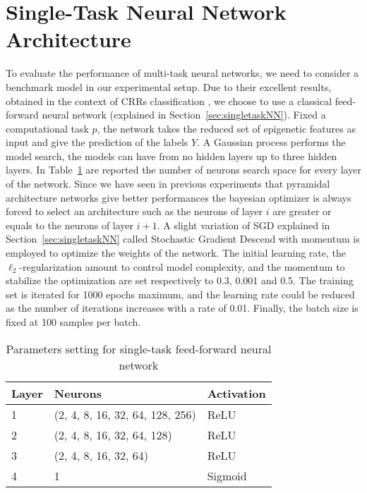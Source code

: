 \section{Single-Task Neural Network Architecture}
To evaluate the performance of multi-task neural networks, we need to consider a benchmark model in our experimental setup. Due to their excellent results, obtained in the context of CRRs classification \cite{WassermannDECRES}, we choose to use a classical feed-forward neural network (explained in Section~\ref{sec:singletaskNN}). Fixed a computational task $p$, the network takes the reduced set of epigenetic features as input and give the prediction of the labels $Y$. A Gaussian process performs the model search, the models can have from no hidden layers up to three hidden layers. In Table~\ref{tab:mlp_single_arch} are reported the number of neurons search space for every layer of the network. Since we have seen in previous experiments that pyramidal architecture networks give better performances the bayesian optimizer is always forced to select an architecture such as the neurons of layer $i$ are greater or equals to the neurons of layer $i+1$. 
A slight variation of SGD explained in Section~\ref{sec:singletaskNN} called Stochastic Gradient Descend with momentum is employed to optimize the weights of the network. The initial learning rate, the $\ell_2$-regularization amount to control model complexity, and the momentum to stabilize the optimization are set respectively to 0.3, 0.001 and 0.5. The training set is iterated for 1000 epochs maximum, and the learning rate could be reduced as the number of iterations increases with a rate of 0.01. Finally, the batch size is fixed at 100 samples per batch.  
\begin{table}[t]
\centering
\begin{tabular}{lll}
\toprule
\textbf{Layer} & \textbf{Neurons} & \textbf{Activation} \\ 
\midrule
1 & (2, 4, 8, 16, 32, 64, 128, 256) & ReLU \\ 
\midrule
2 & (2, 4, 8, 16, 32, 64, 128) & ReLU \\ 
\midrule
3 & (2, 4, 8, 16, 32, 64) & ReLU \\ 
\midrule
4 & 1 & Sigmoid \\ 
\bottomrule
\end{tabular}
\caption{Parameters setting for single-task feed-forward neural network}
\label{tab:mlp_single_arch}
\end{table}

